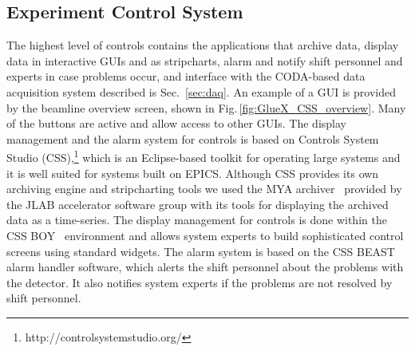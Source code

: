 \subsection{Experiment Control System \label{sec:alarms}}
The highest level of controls contains the applications that archive data, display data in interactive GUIs and as stripcharts, alarm and notify shift personnel and experts in case problems occur, and interface with the CODA-based data acquisition system described is Sec.~\ref{sec:daq}.
An example of a GUI is provided by the beamline overview screen, shown in Fig.\,\ref{fig:GlueX_CSS_overview}. Many of the buttons are active and allow access to other GUIs.
The display management and the alarm system for \gx{} controls is based on Controls System Studio (CSS),\footnote{http://controlsystemstudio.org/}  which is an Eclipse-based toolkit for operating large systems and it is well suited for systems built on EPICS. Although CSS provides its own archiving engine and stripcharting tools we used the MYA archiver~\cite{Slominski:2009icaleps} provided by the JLAB accelerator software group with its tools for displaying the archived data as a time-series. The display management for \gx{} controls is done within the CSS BOY~\cite{Chen:2011icaleps} environment and allows system experts to build sophisticated control screens using standard widgets. The alarm system is based on the CSS BEAST\cite{Kasemir:2009icaleps} alarm handler software, which alerts the shift personnel about the problems with the detector. It also notifies system experts if the problems are not resolved by shift personnel. 
